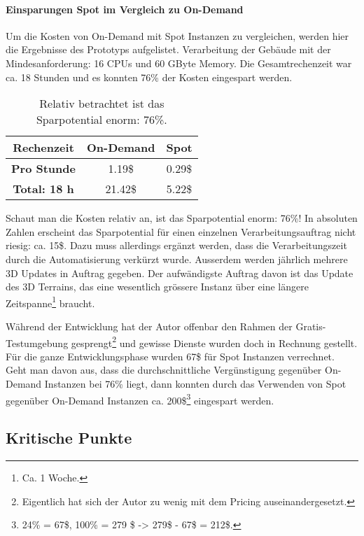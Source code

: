 \paragraph{Einsparungen Spot im Vergleich zu On-Demand}
Um die Kosten von On-Demand mit Spot Instanzen zu vergleichen, werden hier die Ergebnisse des Prototyps aufgelistet. Verarbeitung der Gebäude mit der Mindesanforderung: 16 CPUs und 60 GByte Memory. Die Gesamtrechenzeit war ca. 18 Stunden und es konnten 76\% der Kosten eingespart werden.

\begin{table}[!htbp]
\begin{center}
\begin{tabular}{| c | c | c |}
    \hline
	\textbf{Rechenzeit} & \textbf{On-Demand} & \textbf{Spot}\\
	\hline
	 \textbf{Pro Stunde} & 1.19\$ & 0.29\$\\
	\hline
	 \textbf{Total: 18 h} & 21.42\$ & 5.22\$\\
	\hline
\end{tabular}
\caption{\label{tab:price_difference}Relativ betrachtet ist das Sparpotential enorm: 76\%.}
\end{center}
\end{table}

Schaut man die Kosten relativ an, ist das Sparpotential enorm: 76\%! In absoluten Zahlen erscheint das Sparpotential für einen einzelnen Verarbeitungsauftrag nicht riesig: ca. 15\$. Dazu muss allerdings ergänzt werden, dass die Verarbeitungszeit durch die Automatisierung verkürzt wurde. Ausserdem werden jährlich mehrere 3D Updates in Auftrag gegeben. Der aufwändigste Auftrag davon ist das Update des 3D Terrains, das eine wesentlich grössere Instanz über eine längere Zeitspanne\footnote{Ca. 1 Woche.} braucht.

Während der Entwicklung hat der Autor offenbar den Rahmen der Gratis-Testumgebung gesprengt\footnote{Eigentlich hat sich der Autor zu wenig mit dem Pricing auseinandergesetzt.} und gewisse Dienste wurden doch in Rechnung gestellt. Für die ganze Entwicklungsphase wurden 67\$ für Spot Instanzen verrechnet. Geht man davon aus, dass die durchschnittliche Vergünstigung gegenüber On-Demand Instanzen bei 76\% liegt, dann konnten durch das Verwenden von Spot gegenüber On-Demand Instanzen ca. 200\$\footnote{24\% = 67\$, 100\% = 279 \$ -> 279\$ - 67\$ = 212\$.} eingespart werden. 

\subsection{Kritische Punkte}

